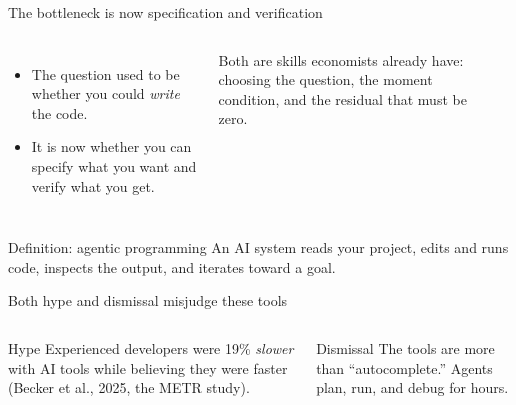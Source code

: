 \documentclass[aspectratio=169,10pt]{beamer}
\newcommand{\emphc}[1]{\textcolor{harvardcrimson}{#1}}
\begin{document}
\begin{frame}{The bottleneck is now specification and verification}
\begin{columns}[T]
\begin{itemize}\itemsep6pt
  \item The question used to be whether you could \emph{write} the code.
  \item It is now whether you can \emphc{specify} what you want and \emphc{verify} what you get.
\end{itemize}
\vspace{0.7em}
Both are skills economists already have: choosing the question, the moment condition, and the residual that must be zero.
\begin{center}
\end{center}
\end{columns}

\vspace{0.9em}
\begin{block}{Definition: agentic programming}
An AI system reads your project, edits and runs code, inspects the output, and iterates toward a goal.
\end{block}
\end{frame}

\begin{frame}{Both hype and dismissal misjudge these tools}
\begin{columns}[T]
\begin{alertblock}{Hype}
Experienced developers were 19\% \emph{slower} with AI tools while believing they were faster (Becker et al., 2025, the METR study).
\end{alertblock}
\begin{alertblock}{Dismissal}
The tools are more than ``autocomplete.'' Agents plan, run, and debug for hours.
\end{alertblock}
\end{columns}
\end{frame}
\end{document}
